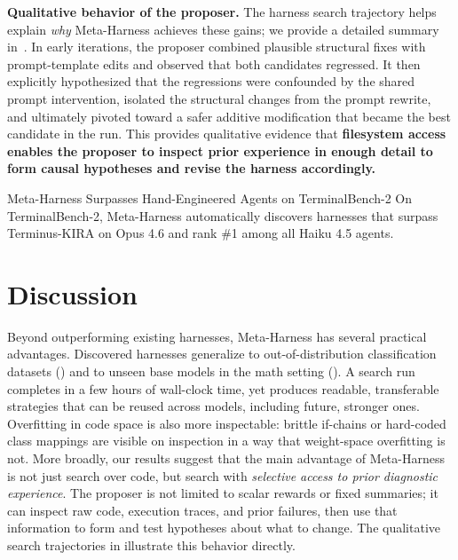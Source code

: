 \documentclass{article}
\begin{document}
\textbf{Qualitative behavior of the proposer.}
The harness search trajectory helps explain \textit{why} Meta-Harness achieves these gains; we provide a detailed summary in~.
In early iterations, the proposer combined plausible structural fixes with prompt-template edits and observed that both candidates regressed.
It then explicitly hypothesized that the regressions were confounded by the shared prompt intervention, isolated the structural changes from the prompt rewrite, and ultimately pivoted toward a safer additive modification that became the best candidate in the run.
This provides qualitative evidence that \textbf{filesystem access enables the proposer to inspect prior experience in enough detail to form causal hypotheses and revise the harness accordingly.}

\begin{center}
\begin{takeawaybox}{Meta-Harness Surpasses Hand-Engineered Agents on TerminalBench-2}
On TerminalBench-2, Meta-Harness automatically discovers harnesses that surpass Terminus-KIRA on Opus 4.6 and rank \#1 among all Haiku 4.5 agents.
\end{takeawaybox}
\end{center}

\section{Discussion}
\label{sec:discussion}

Beyond outperforming existing harnesses, Meta-Harness has several practical advantages.
Discovered harnesses generalize to out-of-distribution classification datasets () and to unseen base models in the math setting ().
A search run completes in a few hours of wall-clock time, yet produces readable, transferable strategies that can be reused across models, including future, stronger ones.
Overfitting in code space is also more inspectable: brittle if-chains or hard-coded class mappings are visible on inspection in a way that weight-space overfitting is not.
More broadly, our results suggest that the main advantage of Meta-Harness is not just search over code, but search with \emph{selective access to prior diagnostic experience}.
The proposer is not limited to scalar rewards or fixed summaries; it can inspect raw code, execution traces, and prior failures, then use that information to form and test hypotheses about what to change.
The qualitative search trajectories in  illustrate this behavior directly.
\end{document}
